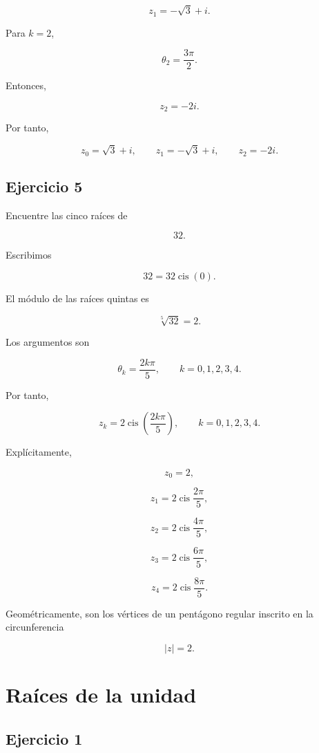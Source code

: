 \documentclass[12pt]{article}
\begin{document}
\[
z_1
=
-\sqrt3+i.
\]

Para \(k=2\),

\[
\theta_2
=
\frac{3\pi}{2}.
\]

Entonces,

\[
z_2=-2i.
\]

Por tanto,

\[
\boxed{
z_0=\sqrt3+i,\qquad
z_1=-\sqrt3+i,\qquad
z_2=-2i
}.
\]


\subsection*{Ejercicio 5}

Encuentre las cinco raíces de

\[
32.
\]

Escribimos

\[
32
=
32\operatorname{cis}(0).
\]

El módulo de las raíces quintas es

\[
\sqrt[5]{32}=2.
\]

Los argumentos son

\[
\theta_k
=
\frac{2k\pi}{5},
\qquad
k=0,1,2,3,4.
\]

Por tanto,

\[
\boxed{
z_k
=
2\operatorname{cis}
\left(
\frac{2k\pi}{5}
\right),
\qquad
k=0,1,2,3,4
}.
\]

Explícitamente,

\[
z_0=2,
\]

\[
z_1=2\operatorname{cis}\frac{2\pi}{5},
\]

\[
z_2=2\operatorname{cis}\frac{4\pi}{5},
\]

\[
z_3=2\operatorname{cis}\frac{6\pi}{5},
\]

\[
z_4=2\operatorname{cis}\frac{8\pi}{5}.
\]

Geométricamente, son los vértices de un pentágono regular inscrito en
la circunferencia

\[
|z|=2.
\]

\section*{Raíces de la unidad}

\subsection*{Ejercicio 1}
\end{document}

